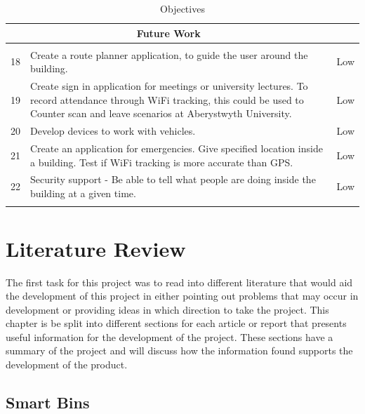 \documentclass{report}
\begin{document}
\begin{table}[h]
\begin{tabular}{c p{11cm} c}
     \\
     \hline
     \multicolumn{2}{c}{Future Work}\\
     \hline
     \\
     18 & Create a route planner application, to guide the user around the building. & Low \\
     19 & Create sign in application for meetings or university lectures. To record attendance through WiFi tracking, this could be used to Counter scan and leave scenarios at Aberystwyth University. & Low \\
     20 & Develop devices to work with vehicles. & Low\\
     21 & Create an application for emergencies. Give specified location inside a building. Test if WiFi tracking is more accurate than GPS. & Low\\
     22 & Security support - Be able to tell what people are doing inside the building at a given time. & Low\\
     \\
     \hline
    \end{tabular}
    \caption{Objectives}
    \label{tab:obj}
\end{table}{}
\clearpage


\chapter{Literature Review}

The first task for this project was to read into different literature that would aid the development of this project in either pointing out problems that may occur in development or providing ideas in which direction to take the project. This chapter is be split into different sections for each article or report that presents useful information for the development of the project. These sections have a summary of the project and will discuss how the information found supports the development of the product.

\section{Smart Bins}
\end{document}
